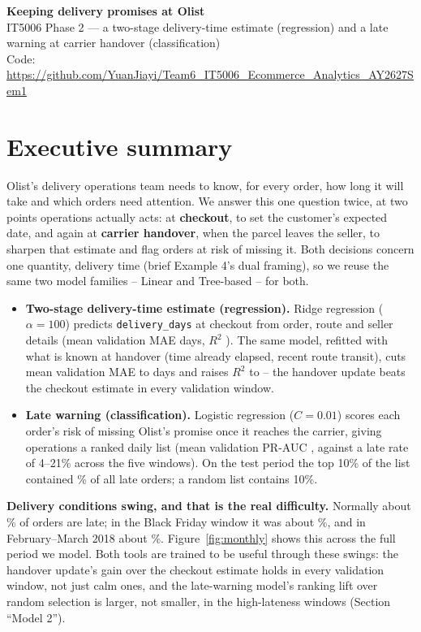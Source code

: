 \documentclass[12pt,a4paper]{article}
\begin{document}
\begin{center}
{\Large\bfseries Keeping delivery promises at Olist}\\[3pt]
{\small IT5006 Phase 2 --- a two-stage delivery-time estimate (regression) and a late warning at carrier handover (classification)}\\[2pt]
{\footnotesize Code: \url{https://github.com/YuanJiayi/Team6_IT5006_Ecommerce_Analytics_AY2627Sem1}}
\end{center}
\vspace{-0.6em}

\section*{Executive summary}
Olist's delivery operations team needs to know, for every order, how long it will take and which orders need attention. We answer this one question twice, at two points operations actually acts: at \textbf{checkout}, to set the customer's expected date, and again at \textbf{carrier handover}, when the parcel leaves the seller, to sharpen that estimate and flag orders at risk of missing it. Both decisions concern one quantity, delivery time (brief Example 4's dual framing), so we reuse the same two model families -- Linear and Tree-based -- for both.

\begin{itemize}\setlength{\itemsep}{0pt}
\item \textbf{Two-stage delivery-time estimate (regression).} Ridge regression (\(\alpha=100\)) predicts \texttt{delivery\_days} at checkout from order, route and seller details (mean validation MAE \CheckoutSelMAE{} days, \(R^2\) \CheckoutSelRSq{}). The same model, refitted with what is known at handover (time already elapsed, recent route transit), cuts mean validation MAE to \HandoverSelMAE{} days and raises \(R^2\) to \HandoverSelRSq{} -- the handover update beats the checkout estimate in every validation window.
\item \textbf{Late warning (classification).} Logistic regression (\(C=0.01\)) scores each order's risk of missing Olist's promise once it reaches the carrier, giving operations a ranked daily list (mean validation PR-AUC \ValSelPR{}, against a late rate of 4--21\% across the five windows). On the test period the top 10\% of the list contained \GainTenModel{}\% of all late orders; a random list contains 10\%.
\end{itemize}

\textbf{Delivery conditions swing, and that is the real difficulty.} Normally about \NormalLate{}\% of orders are late; in the Black Friday window it was about \BlackFridayLate{}\%, and in February--March 2018 about \FebMarLate{}\%. Figure~\ref{fig:monthly} shows this across the full period we model. Both tools are trained to be useful through these swings: the handover update's gain over the checkout estimate holds in every validation window, not just calm ones, and the late-warning model's ranking lift over random selection is larger, not smaller, in the high-lateness windows (Section ``Model 2'').
\end{document}
